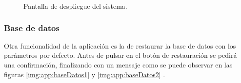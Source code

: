 \documentclass[../PFC.tex]{subfiles}
\begin{document}
\begin{figure}[H]
  \centering
  \null\hfill
  \caption{Pantalla de despliegue del sistema.}
  \label{img:app:sistema}
\end{figure}


\subsubsection{Base de datos}
\label{App:AD:D:Base de dtaos}

Otra funcionalidad de la aplicación es la de restaurar la base de datos con los parámetros por defecto. Antes de pulsar en el botón de restauración se pedirá una confirmación, finalizando con un mensaje como se puede observar en las figuras \ref{img:app:baseDatos1} y \ref{img:app:baseDatos2} .
\end{document}
